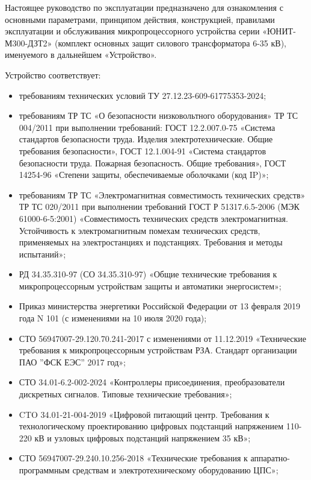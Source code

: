 \par
Настоящее руководство по эксплуатации предназначено для ознакомления с основными параметрами, принципом действия, конструкцией, правилами эксплуатации и обслуживания микропроцессорного устройства серии «ЮНИТ-М300-ДЗТ2» (комплект основных защит силового трансформатора 6-35 кВ), именуемого в дальнейшем «Устройство».

\par
Устройство соответствует:
\begin{itemize}
\item требованиям технических условий ТУ 27.12.23-609-61775353-2024;
\item требованиям ТР ТС «О безопасности низковольтного оборудования» ТР ТС 004/2011 при выполнении требований: ГОСТ 12.2.007.0-75 «Система стандартов безопасности труда. Изделия электротехнические. Общие требования безопасности», ГОСТ 12.1.004-91 «Система стандартов безопасности труда. Пожарная безопасность. Общие требования», ГОСТ 14254-96 «Степени защиты, обеспечиваемые оболочками (код IP)»; 
\item требованиям ТР ТС «Электромагнитная совместимость технических средств» ТР ТС 020/2011 при выполнении требований ГОСТ Р 51317.6.5-2006 (МЭК 61000-6-5:2001) «Совместимость технических средств электромагнитная. Устойчивость к электромагнитным помехам технических средств, применяемых на электростанциях и подстанциях. Требования и методы испытаний»;
\item РД 34.35.310-97 (СО 34.35.310-97) «Общие технические требования к микропроцессорным устройствам защиты и автоматики энергосистем»;
\item Приказ министерства энергетики Российской Федерации от 13 февраля 2019 года N 101 (с изменениями на 10 июля 2020 года);
\item СТО 56947007-29.120.70.241-2017 с изменениями от 11.12.2019 «Технические требования к микропроцессорным устройствам РЗА. Стандарт организации ПАО ''ФСК ЕЭС'' 2017 год»;
\item СТО 34.01-6.2-002-2024 «Контроллеры присоединения, преобразователи дискретных сигналов. Типовые технические требования»;
\item CTO 34.01-21-004-2019 «Цифровой питающий центр. Требования к технологическому проектированию цифровых подстанций напряжением 110-220 кВ и узловых цифровых подстанций напряжением 35 кВ»;
\item СТО 56947007-29.240.10.256-2018 «Технические требования к аппаратно-программным средствам и электротехническому оборудованию ЦПС»;

\end{itemize}
